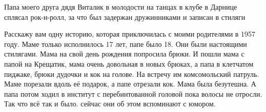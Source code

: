 \begin{itemize}
Папа моего друга дядя Виталик в молодости на танцах в клубе в Дарнице сплясал
рок-н-ролл, за что был задержан дружинниками и записан в стиляги


Расскажу вам одну историю, которая приключилась с моими родителями в 1957 году.
Маме только исполнилось 17 лет, папе было 18. Они были настоящими стилягами.
Мама на свой день рождения попросила брюки. И пошли мама с папой на Крещатик,
мама очень довольная в новых брюках, а папа в клетчатом пиджаке, брюки дудочки
и кок на голове. На встречу им комсомольский патруль. Маме порезали вдоль её
подарок, а папе отрезали кок. Мама была безутешна. А папа потом ходил в
институт с перебинтованной головой пока волосы не отросли. Так что всё так и
было. сейчас они об этом вспоминают с юмором.

\end{itemize} %

